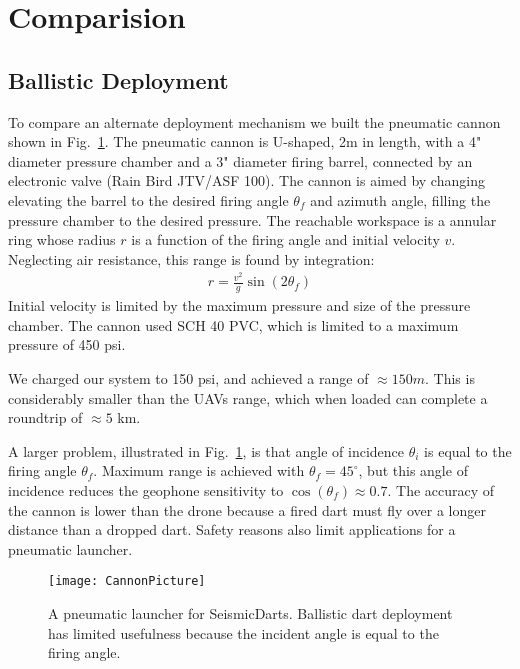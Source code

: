 \section{Comparision}\label{sec:Comparision}

\subsection{Ballistic Deployment}
To compare an alternate deployment mechanism we built the pneumatic cannon shown in Fig.~\ref{fig:CannonPicture}.
The pneumatic cannon is U-shaped,  2m in length, with a 4" diameter pressure chamber and a 3" diameter firing barrel, connected by an electronic valve (Rain Bird JTV/ASF 100). 
The cannon is aimed by changing elevating the barrel to the desired firing angle $\theta_f$  and azimuth angle, filling the pressure chamber to the desired pressure.  
The reachable workspace is a annular ring whose radius $r$ is a function of the firing angle and initial velocity $v$. 
Neglecting air resistance, this range is found by integration:
\begin{align}
r = \frac{v^2}{g} \sin( 2 \theta_f )
\end{align} 
Initial velocity is limited by the maximum pressure and size of the pressure chamber.
The cannon used  SCH 40 PVC, which is limited to a maximum pressure of 450 psi.

We charged our system to 150 psi, and achieved a range of $\approx 150 m$.
This is considerably smaller than the UAVs range, which when loaded can complete a roundtrip of $\approx 5$ km.

A larger problem, illustrated in Fig.~\ref{fig:CannonPicture}, is that angle of incidence $\theta_i$ is equal to the firing angle $\theta_f$. 
Maximum range is achieved with $\theta_f = 45^\circ$, but this angle of incidence reduces the geophone sensitivity to $\cos(\theta_f )\approx 0.7$.
The accuracy of the cannon is lower than the drone because a fired dart must fly over a longer distance than a dropped dart. 
Safety reasons also limit applications for a pneumatic launcher.


\begin{figure} \centering
  {\texttt{[image: CannonPicture]}}
 \caption{A pneumatic launcher for SeismicDarts.  Ballistic dart deployment has limited usefulness because the incident angle is equal to the firing angle.} 
 \label{fig:CannonPicture}
\end{figure}



